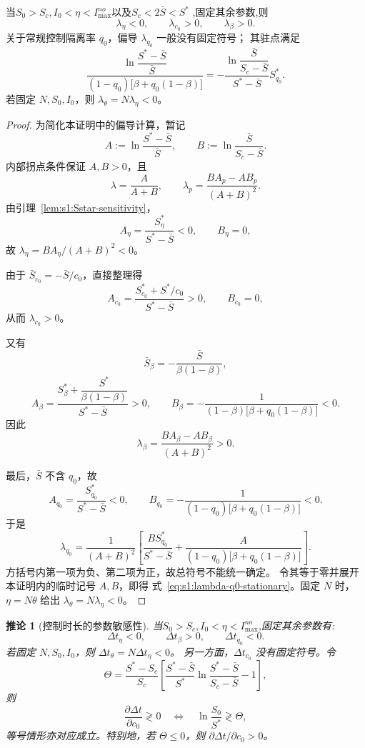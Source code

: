 \documentclass[lang=cn,a4paper,newtx]{elegantpaper}
\numberwithin{equation}{section}
\theoremstyle{plain}
\newtheorem{corollaryn}[theorem]{推论}
\begin{document}
\begin{proposition}[拐点相对位置的参数敏感性]
\label{prop:s1:lambda-sensitivity}
当\(S_0>S_c,I_0<\eta<I_{\max}^{no}\)以及$S_c<2\bar S<S^*$ ,固定其余参数,则
\[
\lambda_\eta<0,
\qquad
\lambda_{c_0}>0,
\qquad
\lambda_\beta>0.
\]
关于常规控制隔离率 $q_0$，偏导 $\lambda_{q_0}$ 一般没有固定符号；
其驻点满足
\begin{equation}
\frac{
\ln\dfrac{S^*-\bar S}{\bar S}
}{
(1-q_0)\bigl[\beta+q_0(1-\beta)\bigr]
}
=
-
\frac{
\ln\dfrac{\bar S}{S_c-\bar S}
}{
S^*-\bar S
}
S^*_{q_0}.
\label{eq:s1:lambda-q0-stationary}
\end{equation}
若固定 $N,S_0,I_0$，则
$\lambda_\theta=N\lambda_\eta<0$。
\end{proposition}

\begin{proof}
为简化本证明中的偏导计算，暂记
\[
A:=
\ln\frac{S^*-\bar S}{\bar S},
\qquad
B:=
\ln\frac{\bar S}{S_c-\bar S}.
\]
内部拐点条件保证 $A,B>0$，且
\[
\lambda=\frac{A}{A+B},
\qquad
\lambda_p
=
\frac{BA_p-AB_p}{(A+B)^2}.
\]
由引理~\ref{lem:s1:Sstar-sensitivity}，
\[
A_\eta
=
\frac{S^*_\eta}{S^*-\bar S}<0,
\qquad
B_\eta=0,
\]
故 $\lambda_\eta=BA_\eta/(A+B)^2<0$。

由于 $\bar S_{c_0}=-\bar S/c_0$，直接整理得
\[
A_{c_0}
=
\frac{S^*_{c_0}+S^*/c_0}{S^*-\bar S}>0,
\qquad
B_{c_0}=0,
\]
从而 $\lambda_{c_0}>0$。

又有
\[
\bar S_\beta
=
-\frac{\bar S}{\beta(1-\beta)},
\]
\[
A_\beta
=
\frac{
S^*_\beta+\dfrac{S^*}{\beta(1-\beta)}
}{
S^*-\bar S
}>0,
\qquad
B_\beta
=
-\frac{1}{
(1-\beta)\bigl[\beta+q_0(1-\beta)\bigr]
}<0.
\]
因此
\[
\lambda_\beta
=
\frac{BA_\beta-AB_\beta}{(A+B)^2}>0.
\]

最后，$\bar S$ 不含 $q_0$，故
\[
A_{q_0}
=
\frac{S^*_{q_0}}{S^*-\bar S}<0,
\qquad
B_{q_0}
=
-\frac{1}{
(1-q_0)\bigl[\beta+q_0(1-\beta)\bigr]
}<0.
\]
于是
\[
\lambda_{q_0}
=
\frac{1}{(A+B)^2}
\left[
\frac{B S^*_{q_0}}{S^*-\bar S}
+
\frac{A}{
(1-q_0)\bigl[\beta+q_0(1-\beta)\bigr]
}
\right].
\]
方括号内第一项为负、第二项为正，故总符号不能统一确定。
令其等于零并展开本证明内的临时记号 $A,B$，即得
式~\eqref{eq:s1:lambda-q0-stationary}。固定 $N$ 时，
$\eta=N\theta$ 给出 $\lambda_\theta=N\lambda_\eta<0$。
\end{proof}

\begin{corollaryn}[控制时长的参数敏感性]
\label{cor:s1:duration-sensitivity}
当\(S_0>S_c,I_0<\eta<I_{\max}^{no}\),固定其余参数有:
\[
\Delta t_\eta<0,
\qquad
\Delta t_\beta>0,
\qquad
\Delta t_{q_0}<0.
\]
若固定 $N,S_0,I_0$，则
$\Delta t_\theta=N\Delta t_\eta<0$。
另一方面，$\Delta t_{c_0}$ 没有固定符号。令
\[
\Theta
=
\frac{S^*-S_c}{S_c}
\left[
\frac{S^*-\bar S}{S^*}
\ln\frac{S^*-\bar S}{S_c-\bar S}
-1
\right],
\]
则
\[
\frac{\partial\Delta t}{\partial c_0}
\gtrless0
\quad\Longleftrightarrow\quad
\ln\frac{S_0}{S^*}
\gtrless\Theta,
\]
等号情形亦对应成立。特别地，若 $\Theta\le0$，则
$\partial\Delta t/\partial c_0>0$。
\end{corollaryn}
\end{document}
